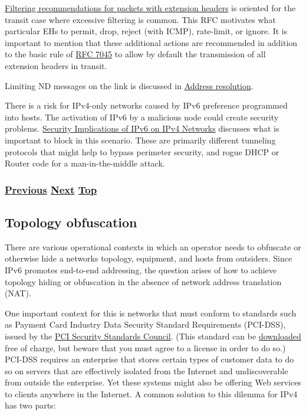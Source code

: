 \documentclass[
]{article}
\begin{document}
\href{https://www.rfc-editor.org/info/rfc9288}{Filtering recommendations
for packets with extension headers} is oriented for the transit case
where excessive filtering is common. This RFC motivates what particular
EHs to permit, drop, reject (with ICMP), rate-limit, or ignore. It is
important to mention that these additional actions are recommended in
addition to the basic rule of
\href{https://www.rfc-editor.org/info/rfc7045}{RFC 7045} to allow by
default the transmission of all extension headers in transit.

Limiting ND messages on the link is discussed in
\hyperref[address-resolution]{Address resolution}.

There is a risk for IPv4-only networks caused by IPv6 preference
programmed into hosts. The activation of IPv6 by a malicious node could
create security problems.
\href{https://www.rfc-editor.org/info/rfc7123}{Security Implications of
IPv6 on IPv4 Networks} discusses what is important to block in this
scenario. These are primarily different tunneling protocols that might
help to bypass perimeter security, and rogue DHCP or Router code for a
man-in-the-middle attack.

\subsubsection{\texorpdfstring{\hyperref[layer-2-considerations]{Previous}
\hyperref[topology-obfuscation]{Next}
\hyperref[security]{Top}}{Previous Next Top}}\label{previous-next-top-24}

\pagebreak

\subsection{Topology obfuscation}\label{topology-obfuscation}

There are various operational contexts in which an operator needs to
obfuscate or otherwise hide a network\textquotesingle s topology,
equipment, and hosts from outsiders. Since IPv6 promotes end-to-end
addressing, the question arises of how to achieve topology hiding or
obfuscation in the absence of network address translation (NAT).

One important context for this is networks that must conform to
standards such as Payment Card Industry Data Security Standard
Requirements (PCI-DSS), issued by the
\href{https://www.pcisecuritystandards.org}{PCI Security Standards
Council}. (This standard can be
\href{https://docs-prv.pcisecuritystandards.org/PCI\%20DSS/Standard/PCI-DSS-v4_0.pdf}{downloaded}
free of charge, but beware that you must agree to a license in order to
do so.) PCI-DSS requires an enterprise that stores certain types of
customer data to do so on servers that are effectively isolated from the
Internet and undiscoverable from outside the enterprise. Yet these
systems might also be offering Web services to clients anywhere in the
Internet. A common solution to this dilemma for IPv4 has two parts:
\end{document}
